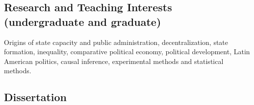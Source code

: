\subsection*{Research and Teaching Interests (undergraduate and graduate)}

Origins of state capacity and public administration, decentralization, state formation, inequality, comparative political economy, political development, Latin American politics, causal inference, experimental methods and statistical methods.

\subsection*{Dissertation}

	{\unskip}
